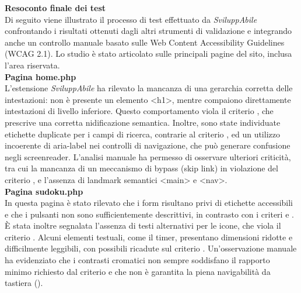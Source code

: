 \vspace{0.8cm}

\noindent \textbf{Resoconto finale dei test}\\
\noindent Di seguito viene illustrato il processo di test effettuato da \textit{SviluppAbile} confrontando i risultati ottenuti dagli altri strumenti di validazione e integrando anche un controllo manuale basato sulle Web Content Accessibility Guidelines (WCAG 2.1). Lo studio è stato articolato sulle principali pagine del sito, inclusa l’area riservata.\\

\noindent \textbf{Pagina home.php}\\
L’estensione \textit{SviluppAbile} ha rilevato la mancanza di una gerarchia corretta delle intestazioni: non è presente un elemento <h1>, mentre compaiono direttamente intestazioni di livello inferiore. Questo comportamento viola il criterio {}, che prescrive una corretta nidificazione semantica. Inoltre, sono state individuate etichette duplicate per i campi di ricerca, contrarie al criterio {}, ed un utilizzo incoerente di aria-label nei controlli di navigazione, che può generare confusione negli screenreader.
L’analisi manuale ha permesso di osservare ulteriori criticità, tra cui la mancanza di un meccanismo di bypass (skip link) in violazione del criterio {}, e l’assenza di landmark semantici <main> e <nav>.\\

\noindent \textbf{Pagina sudoku.php}\\
In questa pagina è stato rilevato che i form risultano privi di etichette accessibili e che i pulsanti non sono sufficientemente descrittivi, in contrasto con i criteri {} e {}. È stata inoltre segnalata l’assenza di testi alternativi per le icone, che viola il criterio {}. Alcuni elementi testuali, come il timer, presentano dimensioni ridotte e difficilmente leggibili, con possibili ricadute sul criterio {}.
Un’osservazione manuale ha evidenziato che i contrasti cromatici non sempre soddisfano il rapporto minimo richiesto dal criterio {} e che non è garantita la piena navigabilità da tastiera ({}).\\

